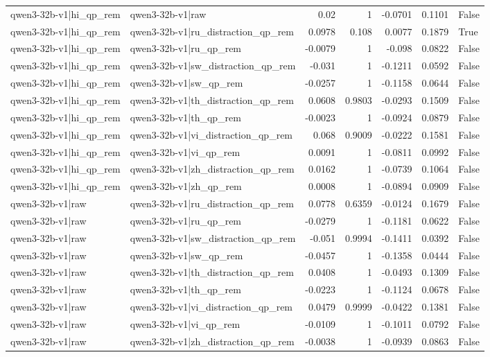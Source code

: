 \begin{table}
\begin{tabular}{l l r r r r l}
qwen3-32b-v1|hi_qp_rem & qwen3-32b-v1|raw & 0.02 & 1 & -0.0701 & 0.1101 & False \\
qwen3-32b-v1|hi_qp_rem & qwen3-32b-v1|ru_distraction_qp_rem & 0.0978 & 0.108 & 0.0077 & 0.1879 & True \\
qwen3-32b-v1|hi_qp_rem & qwen3-32b-v1|ru_qp_rem & -0.0079 & 1 & -0.098 & 0.0822 & False \\
qwen3-32b-v1|hi_qp_rem & qwen3-32b-v1|sw_distraction_qp_rem & -0.031 & 1 & -0.1211 & 0.0592 & False \\
qwen3-32b-v1|hi_qp_rem & qwen3-32b-v1|sw_qp_rem & -0.0257 & 1 & -0.1158 & 0.0644 & False \\
qwen3-32b-v1|hi_qp_rem & qwen3-32b-v1|th_distraction_qp_rem & 0.0608 & 0.9803 & -0.0293 & 0.1509 & False \\
qwen3-32b-v1|hi_qp_rem & qwen3-32b-v1|th_qp_rem & -0.0023 & 1 & -0.0924 & 0.0879 & False \\
qwen3-32b-v1|hi_qp_rem & qwen3-32b-v1|vi_distraction_qp_rem & 0.068 & 0.9009 & -0.0222 & 0.1581 & False \\
qwen3-32b-v1|hi_qp_rem & qwen3-32b-v1|vi_qp_rem & 0.0091 & 1 & -0.0811 & 0.0992 & False \\
qwen3-32b-v1|hi_qp_rem & qwen3-32b-v1|zh_distraction_qp_rem & 0.0162 & 1 & -0.0739 & 0.1064 & False \\
qwen3-32b-v1|hi_qp_rem & qwen3-32b-v1|zh_qp_rem & 0.0008 & 1 & -0.0894 & 0.0909 & False \\
qwen3-32b-v1|raw & qwen3-32b-v1|ru_distraction_qp_rem & 0.0778 & 0.6359 & -0.0124 & 0.1679 & False \\
qwen3-32b-v1|raw & qwen3-32b-v1|ru_qp_rem & -0.0279 & 1 & -0.1181 & 0.0622 & False \\
qwen3-32b-v1|raw & qwen3-32b-v1|sw_distraction_qp_rem & -0.051 & 0.9994 & -0.1411 & 0.0392 & False \\
qwen3-32b-v1|raw & qwen3-32b-v1|sw_qp_rem & -0.0457 & 1 & -0.1358 & 0.0444 & False \\
qwen3-32b-v1|raw & qwen3-32b-v1|th_distraction_qp_rem & 0.0408 & 1 & -0.0493 & 0.1309 & False \\
qwen3-32b-v1|raw & qwen3-32b-v1|th_qp_rem & -0.0223 & 1 & -0.1124 & 0.0678 & False \\
qwen3-32b-v1|raw & qwen3-32b-v1|vi_distraction_qp_rem & 0.0479 & 0.9999 & -0.0422 & 0.1381 & False \\
qwen3-32b-v1|raw & qwen3-32b-v1|vi_qp_rem & -0.0109 & 1 & -0.1011 & 0.0792 & False \\
qwen3-32b-v1|raw & qwen3-32b-v1|zh_distraction_qp_rem & -0.0038 & 1 & -0.0939 & 0.0863 & False \\

\end{tabular}
\end{table}
